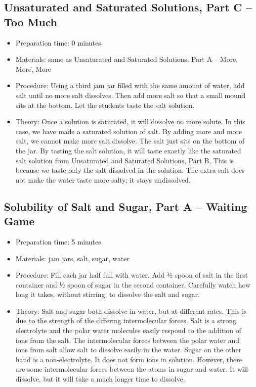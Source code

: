 \subsection{Unsaturated and Saturated Solutions, Part C – Too Much}
\begin{itemize}
\item{Preparation time: 0 minutes}
\item{Materials: same as Unsaturated and Saturated Solutions, Part A – More, More, More}
\item{Procedure: Using a third jam jar filled with the same amount of water, add salt until no more salt dissolves. Then add more salt so that a small mound sits at the bottom. Let the students taste the salt solution.}
\item{Theory:  Once a solution is saturated, it will dissolve no more solute. In this case, we have made a saturated solution of salt. By adding more and more salt, we cannot make more salt dissolve. The salt just sits on the bottom of the jar. By tasting the salt solution, it will taste exactly like the saturated salt solution from Unsaturated and Saturated Solutions, Part B. This is because we taste only the salt dissolved in the solution. The extra salt does not make the water taste more salty; it stays undissolved. }
\end{itemize}

\subsection{Solubility of Salt and Sugar, Part A – Waiting Game}
\begin{itemize}
\item{Preparation time: 5 minutes}
\item{Materials: jam jars, salt, sugar, water}
\item{Procedure: Fill each jar half full with water. Add ½ spoon of salt in the first container and ½ spoon of sugar in the second container. Carefully watch how long it takes, without stirring, to dissolve the salt and sugar.}
\item{Theory: Salt and sugar both dissolve in water, but at different rates. This is due to the strength of the differing intermolecular forces. Salt is a strong electrolyte and the polar water molecules easily respond to the addition of ions from the salt. The intermolecular forces between the polar water and ions from salt allow salt to dissolve easily in the water. Sugar on the other hand is a non-electrolyte. It does not form ions in solution. However, there are some intermolecular forces between the atoms in sugar and water. It will dissolve, but it will take a much longer time to dissolve.}
\end{itemize}

